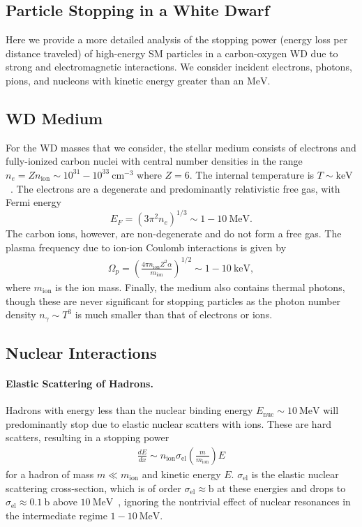 \documentclass[preprintnumbers,amsmath,amssymb,prd,superscriptaddress]{revtex4}
\newcommand{\MeV}{\text{MeV}}
\newcommand{\keV}{\text{keV}}
\newcommand{\cm}{\text{cm}}
\newcommand{\bn}{\text{b}} %
\newcommand{\ion}{\text{ion}}
\newcommand{\el}{\text{el}}
\def\r{\right)}
\def\l{\left(}
\begin{document}
\begin{appendices}
\renewcommand{\thesubsection}{\arabic{subsection}}
\section{Particle Stopping in a White Dwarf}
\label{sec:wdpdg}
Here we provide a more detailed analysis of the stopping power (energy loss per distance traveled) of high-energy SM particles in a carbon-oxygen WD due to strong and electromagnetic interactions.
We consider incident electrons, photons, pions, and nucleons with kinetic energy greater than an $\MeV$.

\subsection{WD Medium}
For the WD masses that we consider, the stellar medium consists of electrons and fully-ionized carbon nuclei with central number densities in the range $n_e = Z n_\ion \sim 10^{31} - 10^{33} ~\cm^{-3}$ where $Z=6$.
The internal temperature is $T \sim \keV$~\cite{KippenhahnWeigert}.
The electrons are a degenerate and predominantly relativistic free gas, with Fermi energy
\begin{equation}
  E_F = (3 \pi^2 n_e)^{1/3} \sim 1 -10 ~\MeV.
\end{equation}
The carbon ions, however, are non-degenerate and do not form a free gas.
The plasma frequency due to ion-ion Coulomb interactions is given by
\begin{align}
\Omega_p = \l \frac{4 \pi n_\ion Z^2 \alpha}{m_\ion}\r^{1/2} \sim 1 - 10~\keV,
\end{align}
where $m_\ion$ is the ion mass.
Finally, the medium also contains thermal photons, though these are never significant for stopping particles as the photon number density $n_\gamma \sim T^3$ is much smaller than that of electrons or ions.

\subsection{Nuclear Interactions}
\label{sec:nuclear}

\paragraph{Elastic Scattering of Hadrons.}
Hadrons with energy less than the nuclear binding energy $E_\text{nuc} \sim 10~\MeV$ will predominantly stop due to elastic nuclear scatters with ions.
These are hard scatters, resulting in a stopping power
\begin{align}
  \frac{dE}{dx} \sim n_\ion \sigma_\el
\l \frac{m}{m_\ion}\r E
  \end{align}
for a hadron of mass $m \ll m_\ion$ and kinetic energy $E$.
$\sigma_\el$ is the elastic nuclear scattering cross-section, which is of order $\sigma_\el \approx \bn$ at these energies and drops to $\sigma_\el \approx 0.1~\bn$ above $10~\MeV$~\cite{Tavernier}, ignoring the nontrivial effect of nuclear resonances in the intermediate regime $1 - 10~\MeV$.


\end{appendices}
\end{document}

